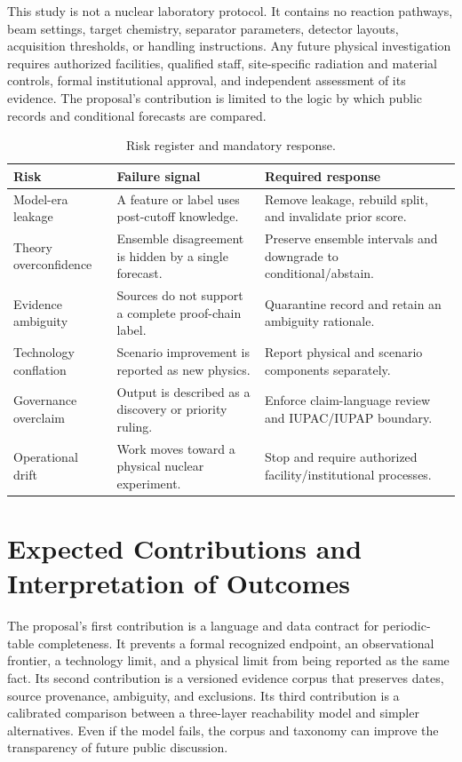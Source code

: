 \documentclass[conference]{IEEEtran}
\begin{document}
This study is not a nuclear laboratory protocol. It contains no reaction pathways, beam settings, target chemistry, separator parameters, detector layouts, acquisition thresholds, or handling instructions. Any future physical investigation requires authorized facilities, qualified staff, site-specific radiation and material controls, formal institutional approval, and independent assessment of its evidence. The proposal's contribution is limited to the logic by which public records and conditional forecasts are compared.

\begin{table}[!t]
\caption{Risk register and mandatory response.}
\label{tab:risks}
\centering
\renewcommand{\arraystretch}{1.16}
\begin{tabular}{|P{0.20\columnwidth}|P{0.19\columnwidth}|P{0.28\columnwidth}|}
\hline
\textbf{Risk} & \textbf{Failure signal} & \textbf{Required response} \\
\hline
Model-era leakage & A feature or label uses post-cutoff knowledge. & Remove leakage, rebuild split, and invalidate prior score. \\
\hline
Theory overconfidence & Ensemble disagreement is hidden by a single forecast. & Preserve ensemble intervals and downgrade to conditional/abstain. \\
\hline
Evidence ambiguity & Sources do not support a complete proof-chain label. & Quarantine record and retain an ambiguity rationale. \\
\hline
Technology conflation & Scenario improvement is reported as new physics. & Report physical and scenario components separately. \\
\hline
Governance overclaim & Output is described as a discovery or priority ruling. & Enforce claim-language review and IUPAC/IUPAP boundary. \\
\hline
Operational drift & Work moves toward a physical nuclear experiment. & Stop and require authorized facility/institutional processes. \\
\hline
\end{tabular}
\end{table}

\section{Expected Contributions and Interpretation of Outcomes}

The proposal's first contribution is a language and data contract for periodic-table completeness. It prevents a formal recognized endpoint, an observational frontier, a technology limit, and a physical limit from being reported as the same fact. Its second contribution is a versioned evidence corpus that preserves dates, source provenance, ambiguity, and exclusions. Its third contribution is a calibrated comparison between a three-layer reachability model and simpler alternatives. Even if the model fails, the corpus and taxonomy can improve the transparency of future public discussion.
\end{document}
